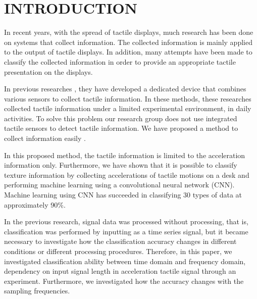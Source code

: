 \documentclass[letterpaper,  10 pt,  conference]{ieeeconf}  %
\begin{document}
\section{INTRODUCTION}
In recent years,  with the spread of tactile displays,  much research has been done on systems that collect information. The collected information is mainly applied to the output of tactile displays. 
In addition,  many attempts have been made to classify the collected information in order to provide an appropriate tactile presentation on the displays. 

In previous researches \cite{c1} \cite{c2},  they have developed a dedicated device that combines various sensors to collect tactile information. In these methods,  these researches collected
tactile information under a limited experimental environment,  in daily activities. To solve this problem our research group does not use integrated tactile sensors to detect tactile information.  
We have proposed a method to collect information easily \cite{c3}. 

In this proposed method,  the tactile information is limited to the acceleration information only.  
Furthermore,  we have shown that it is possible to classify texture information by collecting accelerations of tactile motions on a desk and performing machine learning using a convolutional neural network (CNN).  
Machine learning using CNN has succeeded in classifying 30 types of data at approximately 90\%. 


In the previous research,  signal data was processed without processing,  that is,  classification was performed by inputting as a time series signal,  but it became necessary to investigate how the classification accuracy changes 
in different conditions or different processing procedures.  Therefore,  in this paper,  
we investigated classification ability between time domain and
frequency domain,  dependency on input signal length in
acceleration tactile signal through an experiment. 
Furthermore,  we investigated how the accuracy changes with the sampling frequencies.  

\end{document}
